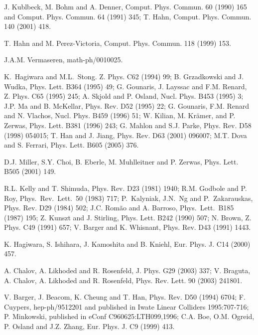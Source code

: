 \begin{thebibliography}{999}
 J. Kublbeck, M. Bohm and A. Denner, Comput. Phys. Commun. 
60 (1990) 165 and Comput. Phys. Commun. 64 (1991) 345; T. Hahn, Comput. Phys. 
Commun. 140 (2001) 418. 

T. Hahn and M. Perez-Victoria, Comput. Phys. Commun. 118 (1999) 153. 

 J.A.M. Vermaseren, math-ph/0010025.

 K.~Hagiwara and M.L.~Stong. Z. Phys. C62 (1994) 99; 
B. Grzadkowski and J. Wudka, Phys. Lett. B364 (1995) 49; 
G. Gounaris, J. Layssac and F.M. Renard, Z. Phys. C65 (1995) 245; 
A. Skjold and P. Osland, Nucl. Phys. B453 (1995) 3;  
J.P. Ma and B. McKellar, Phys. Rev. D52 (1995) 22; 
G. Gounaris, F.M. Renard and N. Vlachos, Nucl. Phys. B459 (1996) 51; 
W. Kilian, M. Kr\"amer, and P. Zerwas, Phys. Lett. B381 (1996) 243; 
G. Mahlon and S.J. Parke,  Phys. Rev. D58 (1998) 054015; 
T. Han and J. Jiang, Phys. Rev. D63 (2001) 096007;   
M.T. Dova and S. Ferrari, Phys. Lett. B605 (2005) 376. 

 D.J. Miller, S.Y. Choi, B. Eberle, M. Muhlleitner and 
P. Zerwas, Phys. Lett. B505 (2001) 149. 

R.L. Kelly and T. Shimuda, Phys. Rev. D23 (1981) 1940;
R.M. Godbole and P. Roy, Phys.\ Rev.\ Lett.\ 50 (1983) 717; 
P.~Kalyniak, J.N.~Ng and P.~Zakarauskas, Phys. Rev. D29 (1984) 502;
J.C. Rom\~{a}o and A. Barroso, Phys.\ Lett.\ B185 (1987) 195;
Z. Kunszt and J. Stirling, Phys. Lett. B242 (1990) 507; 
N. Brown, Z. Phys. C49 (1991) 657; V. Barger and K. Whisnant, Phys. Rev. D43
(1991) 1443. 

 K. Hagiwara, S. Ishihara, J. Kamoshita and B. Kniehl, 
Eur. Phys. J. C14 (2000) 457. 

A. Chalov, A. Likhoded and R. Rosenfeld, J. Phys. G29 (2003) 337; 
V. Braguta, A. Chalov, A. Likhoded and R. Rosenfeld, Phys. Rev. Lett. 90 
(2003) 241801. 

V. Barger, J. Beacom, K. Cheung and T. Han, Phys. Rev. D50 (1994) 6704; 
F. Cuypers, hep-ph/9512201 and published in Iwate Linear Colliders 1995:707-716;
P. Minkowski, published in eConf C960625:LTH099,1996;
C.A. Boe, O.M. Ogreid, P. Osland and J.Z. Zhang, Eur. Phys. J. C9 (1999) 413. 


\end{thebibliography}
